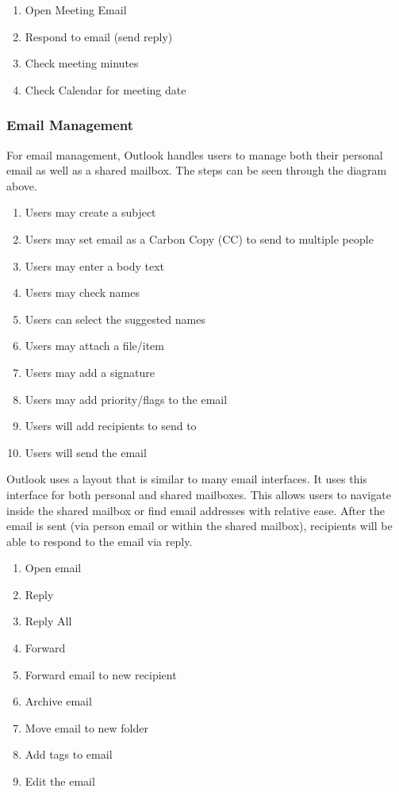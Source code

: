 \documentclass{sigchi}
\begin{document}
\begin{enumerate}
\item Open Meeting Email
\item Respond to email (send reply)
\item Check meeting minutes
\item Check Calendar for meeting date
\end{enumerate}

\subsubsection{Email Management}

For email management, Outlook handles users to manage both their personal email as well as a shared mailbox.  The steps can be seen through the diagram above.

\begin{enumerate}
\item Users may create a subject
\item Users may set email as a Carbon Copy (CC) to send to multiple people
\item Users may enter a body text
\item Users may check names
\item Users can select the suggested names
\item Users may attach a file/item
\item Users may add a signature
\item Users may add priority/flags to the email
\item Users will add recipients to send to
\item Users will send the email
\end{enumerate}

Outlook uses a layout that is similar to many email interfaces. It uses this interface for both personal and shared mailboxes. This allows users to navigate inside the shared mailbox or find email addresses with relative ease.
After the email is sent (via person email or within the shared mailbox), recipients will be able to respond to the email via reply.

\begin{enumerate}
\item Open email
\item Reply
\item Reply All
\item Forward
\item Forward email to new recipient
\item Archive email
\item Move email to new folder
\item Add tags to email
\item Edit the email
\end{enumerate}
\end{document}
